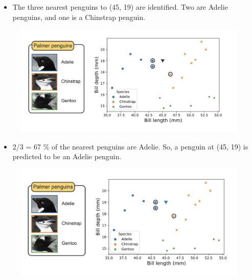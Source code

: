 \documentclass[8pt,dvipsnames]{beamer}
\begin{document}
\begin{frame}
	\begin{itemize}
		\item The three nearest penguins to (45, 19) are identified. Two are Adelie penguins, and one is a Chinstrap penguin.
	\end{itemize}
	\begin{figure}[ht]
		\centering
		\includegraphics[width=\linewidth]{imgs/knn_5.png}
	\end{figure}
\end{frame}

\begin{frame}
	\begin{itemize}
		\item 2/3 = 67 \% of the nearest penguins are Adelie. So, a penguin at (45, 19) is predicted to be an Adelie penguin.
	\end{itemize}
	\begin{figure}[ht]
		\centering
		\includegraphics[width=\linewidth]{imgs/knn_6.png}
	\end{figure}
\end{frame}
\end{document}
